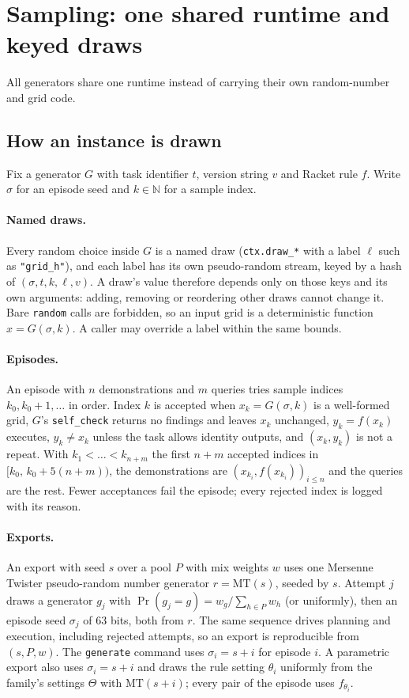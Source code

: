 \documentclass[11pt]{article}
\begin{document}
\section{Sampling: one shared runtime and keyed draws}
\label{sec:sampling}

All generators share one runtime instead of carrying their own random-number and
grid code.

\subsection{How an instance is drawn}

Fix a generator $G$ with task identifier $t$, version string $v$ and Racket rule
$f$. Write $\sigma$ for an episode seed and $k\in\mathbb{N}$ for a sample index.

\paragraph{Named draws.} Every random choice inside $G$ is a named draw
(\texttt{ctx.draw\_*} with a label $\ell$ such as \texttt{"grid\_h"}), and each
label has its own pseudo-random stream, keyed by a hash of $(\sigma,t,k,\ell,v)$.
A draw's value therefore depends only on those keys and its own arguments:
adding, removing or reordering other draws cannot change it. Bare
\texttt{random} calls are forbidden, so an input grid is a deterministic
function $x = G(\sigma,k)$. A caller may override a label within the same
bounds.

\paragraph{Episodes.} An episode with $n$ demonstrations and $m$ queries tries
sample indices $k_0, k_0+1, \dots$ in order. Index $k$ is accepted when $x_k =
G(\sigma,k)$ is a well-formed grid, $G$'s \texttt{self\_check} returns no
findings and leaves $x_k$ unchanged, $y_k = f(x_k)$ executes, $y_k \neq x_k$
unless the task allows identity outputs, and $(x_k,y_k)$ is not a repeat. With
$k_1<\dots<k_{n+m}$ the first $n+m$ accepted indices in $[k_0,\,k_0+5(n+m))$, the
demonstrations are $(x_{k_i}, f(x_{k_i}))_{i\le n}$ and the queries are the rest.
Fewer acceptances fail the episode; every rejected index is logged with its
reason.

\paragraph{Exports.} An export with seed $s$ over a pool $P$ with mix weights
$w$ uses one Mersenne Twister pseudo-random number generator $r=\mathrm{MT}(s)$,
seeded by $s$. Attempt $j$ draws a generator
$g_j$ with $\Pr(g_j=g)=w_g/\sum_{h\in P}w_h$ (or uniformly), then an episode seed
$\sigma_j$ of 63 bits, both from $r$. The same sequence drives planning and
execution, including rejected attempts, so an export is reproducible from
$(s,P,w)$. The \texttt{generate} command uses $\sigma_i = s+i$ for episode $i$.
A parametric export also uses $\sigma_i=s+i$ and draws the rule setting
$\theta_i$ uniformly from the family's settings $\Theta$ with $\mathrm{MT}(s+i)$;
every pair of the episode uses $f_{\theta_i}$.
\end{document}
